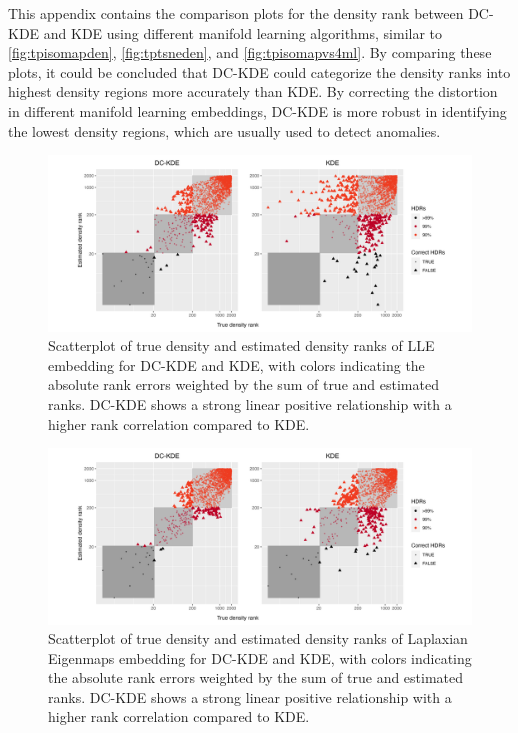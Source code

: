 \documentclass[11pt,a4paper,]{article}
\begin{document}
This appendix contains the comparison plots for the density rank between DC-KDE and KDE using different manifold learning algorithms, similar to \autoref{fig:tpisomapden}, \autoref{fig:tptsneden}, and \autoref{fig:tpisomapvs4ml}. By comparing these plots, it could be concluded that DC-KDE could categorize the density ranks into highest density regions more accurately than KDE. By correcting the distortion in different manifold learning embeddings, DC-KDE is more robust in identifying the lowest density regions, which are usually used to detect anomalies.

\begin{figure}

{\centering \includegraphics[width=1\linewidth]{figures/Twin Peak2000_densityrank_comparison_lle_radius8_r0_5_logrank_rec_colprob_smallblocks3_crossfalse} 

}

\caption{Scatterplot of true density and estimated density ranks of LLE embedding for DC-KDE and KDE, with colors indicating the absolute rank errors weighted by the sum of true and estimated ranks. DC-KDE shows a strong linear positive relationship with a higher rank correlation compared to KDE.}\label{fig:tplleden}
\end{figure}

\begin{figure}

{\centering \includegraphics[width=1\linewidth]{figures/Twin Peak2000_densityrank_comparison_le_radius8_r0_5_logrank_rec_colprob_smallblocks3_crossfalse} 

}

\caption{Scatterplot of true density and estimated density ranks of Laplaxian Eigenmaps embedding for DC-KDE and KDE, with colors indicating the absolute rank errors weighted by the sum of true and estimated ranks. DC-KDE shows a strong linear positive relationship with a higher rank correlation compared to KDE.}\label{fig:tpleden}
\end{figure}
\end{document}
